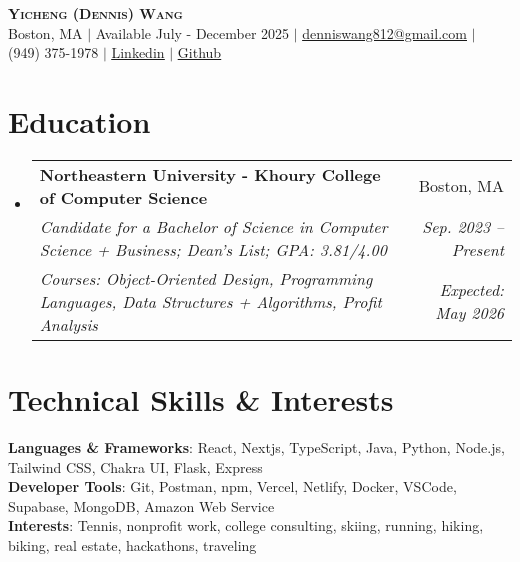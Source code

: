 \documentclass[letterpaper,11pt]{article}
\makeatletter
\newcommand{\eduSubheading}[6]{
  \vspace{-2pt}\item
    \begin{tabular*}{0.97\textwidth}[t]{l@{\extracolsep{\fill}}r}
      \textbf{#1} & #2 \\
      \vspace{-2pt}
      \textit{\small#3} & \hspace{-10cm}\textit{\small #4} \\
      
      \textit{\footnotesize#5}&\textit{\small #6} \\
    \end{tabular*}\vspace{-6pt}
}
\newcommand{\resumeSubHeadingListStart}{\begin{itemize}[leftmargin=0.15in, label={}]}
\newcommand{\resumeSubHeadingListEnd}{\end{itemize}}
\makeatother
\begin{document}

\begin{center}
\textbf{\Huge \scshape Yicheng (Dennis) Wang} \\ \vspace{1pt}
\small Boston, MA  $|$ Available July - December 2025 $|$ \href{mailto:denniswang812@gmail.com}{\underline{denniswang812@gmail.com}} $|$ (949) 375-1978 $|$ \href{https://www.linkedin.com/in/denniswang812/}{\underline{Linkedin}} $|$ \href{https://github.com/denniwang}{\underline{Github}} 
\end{center} 


\section{Education}
  \resumeSubHeadingListStart
    \eduSubheading
      {Northeastern University - Khoury College of Computer Science}{Boston, MA}
      {Candidate for a Bachelor of Science in Computer Science + Business; Dean's List; GPA: 3.81/4.00 } {Sep. 2023 -- Present}
       {Courses: Object-Oriented Design, Programming Languages, Data Structures + Algorithms, Profit Analysis}{Expected: May 2026}
  \resumeSubHeadingListEnd


\section{Technical Skills \& Interests}
 \begin{itemize}[leftmargin=0.15in, label={}]
    \small{\item{
     \textbf{Languages \& Frameworks}{: React, Nextjs, TypeScript, Java, Python, Node.js, Tailwind CSS, Chakra UI, Flask, Express} \\
     \textbf{Developer Tools}{: Git, Postman, npm, Vercel, Netlify, Docker, VSCode, Supabase, MongoDB, Amazon Web Service} \\
     \textbf{Interests}{: Tennis, nonprofit work, college consulting, skiing, running, hiking, biking, real estate, hackathons, traveling}
     \vspace{-5pt}
    }}
    
 \end{itemize}

\end{document}
